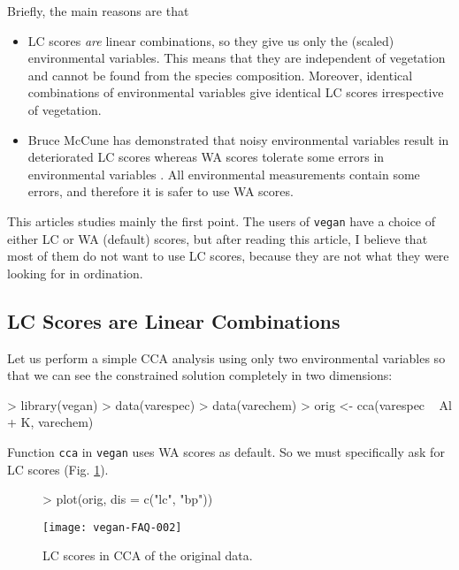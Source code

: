 \documentclass[a4paper]{article}
\begin{document}
Briefly, the main reasons are that
\begin{itemize}
\item
LC scores \emph{are} linear combinations, so they give us only the
(scaled) environmental variables. This means that they are
independent of vegetation and cannot be found from the species
composition.  Moreover, identical combinations of environmental
variables give identical LC scores irrespective of vegetation.
\item
Bruce McCune has demonstrated that noisy environmental variables
result in deteriorated LC scores whereas WA scores tolerate some errors
in environmental variables \cite{McCune97}.  All environmental
measurements contain some errors, and therefore it is safer to use WA
scores.
\end{itemize}
This articles studies mainly the first point.  The users of
\texttt{vegan} have a choice of either LC or WA (default) scores, but
after reading this article, I believe that most of them do not want to
use LC scores, because they are not what they were looking for in
ordination.

\subsection{LC Scores are Linear Combinations}

Let us perform a simple CCA analysis using only two environmental
variables so that we can see the constrained solution completely in
two dimensions:
\begin{Schunk}
\begin{Sinput}
> library(vegan)
> data(varespec)
> data(varechem)
> orig <- cca(varespec ~ Al + K, varechem)
\end{Sinput}
\end{Schunk}
Function \texttt{cca} in \texttt{vegan} uses WA scores as
default. So we must specifically ask for LC scores
(Fig. \ref{fig:ccalc}).
\begin{figure}
\begin{center}
\begin{Schunk}
\begin{Sinput}
> plot(orig, dis = c("lc", "bp"))
\end{Sinput}
\end{Schunk}
\texttt{[image: vegan-FAQ-002]}
\caption{LC scores in CCA of the original data.}
\label{fig:ccalc}
\end{center}
\end{figure}
\end{document}
